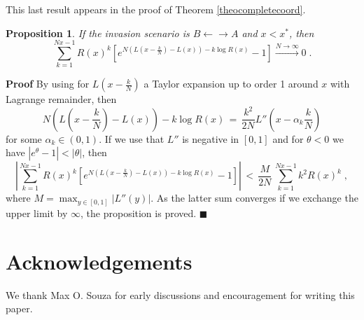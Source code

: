 \documentclass[12pt]{article}
\newtheorem{proposition}{Proposition}
\begin{document}
This last result appears in the proof of Theorem \ref{theocompletecoord}.
\begin{proposition} \label{propsmNx}
If the invasion scenario is $B\leftarrow \rightarrow A$ and $x<x^{\ast}$, then 
\[\sum_{k=1}^{Nx-1}R(x)^k\left[e^{N(L(x-\frac{k}{N})-L(x))-k \log R(x)}-1 \right] \stackrel{N \rightarrow \infty}{\rightarrow} 0\;.\]
\end{proposition}
\textbf{Proof}
By using for $L(x-\frac{k}{N})$ a Taylor expansion up to order 1 around $x$ with Lagrange remainder, then
\[N(L(x-\frac{k}{N})-L(x))-k \log R(x) \,=\, \frac{k^2}{2N}L''(x- \alpha_k \frac{k}{N})\]
for some $\alpha_k \in(0,1)$. If we use that $L''$ is negative in $[0,1]$ and for $\theta<0$ we have $|e^{\theta}-1|<|\theta|$, then
\[\left| \sum_{k=1}^{Nx-1}R(x)^k\left[e^{N(L(x-\frac{k}{N})-L(x))-k \log R(x)}-1 \right]\right| \,<\, \frac{M}{2N}\, \sum_{k=1}^{Nx-1}k^2 R(x)^k \;,\]
where $M =\max_{y \in [0,1]}|L''(y)|$. As the latter sum converges if we exchange the upper limit by $\infty$, the proposition is proved.
$\blacksquare$

\section*{Acknowledgements}
We thank Max O. Souza for early discussions and encouragement for writing this paper.
\end{document}
